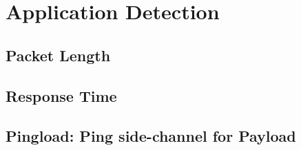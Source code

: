 \chapter{Application Detection}

\section{Packet Length}

\section{Response Time}

\section{Pingload: Ping side-channel for Payload }